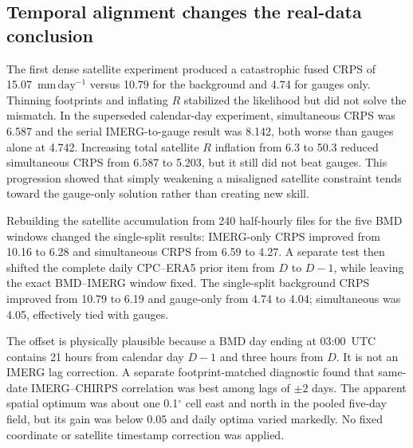\documentclass[10pt,twocolumn]{article}
\newcommand{\mmday}{\mathrm{mm\,day^{-1}}}
\begin{document}
\subsection{Temporal alignment changes the real-data conclusion}

The first dense satellite experiment produced a catastrophic fused CRPS of 15.07~$\mmday$ versus 10.79 for the background and 4.74 for gauges only. Thinning footprints and inflating $R$ stabilized the likelihood but did not solve the mismatch. In the superseded calendar-day experiment, simultaneous CRPS was 6.587 and the serial IMERG-to-gauge result was 8.142, both worse than gauges alone at 4.742. Increasing total satellite $R$ inflation from 6.3 to 50.3 reduced simultaneous CRPS from 6.587 to 5.203, but it still did not beat gauges. This progression showed that simply weakening a misaligned satellite constraint tends toward the gauge-only solution rather than creating new skill.

Rebuilding the satellite accumulation from 240 half-hourly files for the five BMD windows changed the single-split results: IMERG-only CRPS improved from 10.16 to 6.28 and simultaneous CRPS from 6.59 to 4.27. A separate test then shifted the complete daily CPC--ERA5 prior item from $D$ to $D-1$, while leaving the exact BMD--IMERG window fixed. The single-split background CRPS improved from 10.79 to 6.19 and gauge-only from 4.74 to 4.04; simultaneous was 4.05, effectively tied with gauges.

The offset is physically plausible because a BMD day ending at 03:00~UTC contains 21 hours from calendar day $D-1$ and three hours from $D$. It is not an IMERG lag correction. A separate footprint-matched diagnostic found that same-date IMERG--CHIRPS correlation was best among lags of $\pm2$ days. The apparent spatial optimum was about one 0.1$^\circ$ cell east and north in the pooled five-day field, but its gain was below 0.05 and daily optima varied markedly. No fixed coordinate or satellite timestamp correction was applied.
\end{document}
